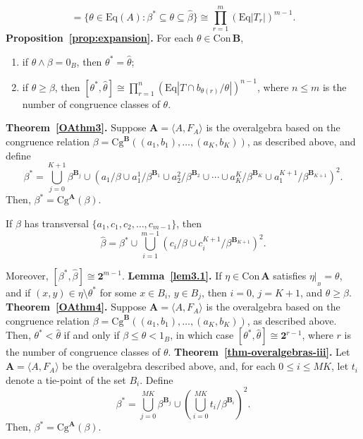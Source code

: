 \documentclass[cm,dissertation,actual,final]{uhthesis}
\theoremstyle{plain}
\theoremstyle{definition}
\theoremstyle{remark}
\numberwithin{theorem}{section}
\numberwithin{claim}{chapter}
\numberwithin{equation}{section}
\numberwithin{conjecture}{chapter}
\newcommand{\<}{\ensuremath{\langle}}
\renewcommand{\>}{\ensuremath{\rangle}}
\renewcommand{\leq}{\ensuremath{\leqslant}}
\renewcommand{\geq}{\ensuremath{\geqslant}}
\newcommand{\meet}{\ensuremath{\wedge}}
\newcommand{\Eq}{\ensuremath{\mathrm{Eq}}}
\newcommand{\Cg}{\ensuremath{\mathrm{Cg}}}
\newcommand{\Con}{\ensuremath{\mathrm{Con\,}}}
\newcommand{\0}{\ensuremath{\mathbf{0}}}
\newcommand{\1}{\ensuremath{\mathbf{1}}}
\newcommand{\2}{\ensuremath{\mathbf{2}}}
\newcommand{\3}{\ensuremath{\mathbf{3}}}
\newcommand{\4}{\ensuremath{\mathbf{4}}}
\newcommand{\5}{\ensuremath{\mathbf{5}}}
\newcommand{\bA}{\ensuremath{\mathbf{A}}}
\newcommand{\bB}{\ensuremath{\mathbf{B}}}
\newcommand{\resB}{\ensuremath{|_{_B}}}
\newcommand{\two}{\ensuremath{\mathbf{2}}}
\begin{document}
  \begin{equation*}
          [\beta^*, \widehat{\beta}] 
          = 
          \{\theta \in \Eq(A) : \beta^* \subseteq \theta \subseteq \widehat{\beta} \}
          \cong \prod_{r=1}^m (\Eq |T_r|)^{m-1}.
  \end{equation*}
\vskip4mm \noindent
{\bf Proposition~\ref{prop:expansion}.}
  For each  $\theta \in \Con\bB$,
  \begin{enumerate}
  \item if $\theta \meet \beta = 0_B$, then $\theta^* = \widehat{\theta}$;
  \item if $\theta \geq \beta$, then $[\theta^*, \widehat{\theta}] \cong
    \prod_{r=1}^n (\Eq |T \cap b_{\theta(r)}/\theta|)^{n-1}$, where $n\leq m$  is
    the number of congruence classes of $\theta$.
  \end{enumerate}
\vskip4mm \noindent
{\bf Theorem~\ref{OAthm3}.}
  Suppose $\bA = \< A, F_A\>$ is the overalgebra
  based on the congruence relation $\beta = \Cg^{\bB}((a_1, b_1), \dots,
  (a_K,b_K))$, as described above, and define
  \[ \beta^* = \bigcup_{j=0}^{K+1} \beta^{\bB_j} \cup 
  (a_1/\beta \cup a_1^1/\beta^{\bB_1} \cup a_2^2/\beta^{\bB_2}    \cup \cdots \cup a_K^K/\beta^{\bB_K}\cup a_1^{K+1}/\beta^{\bB_{K+1}})^2.
  \]
  Then, $\beta^* = \Cg^{\bA}(\beta)$.  

  If $\beta$ has transversal $\{a_1, c_1, c_2, \dots, c_{m-1}\}$, then
  \begin{equation*}
    \widehat{\beta} = \beta^* \cup \bigcup_{i=1}^{m-1} (c_i/\beta \cup
    c^{K+1}_i/\beta^{\bB_{K+1}})^2.
  \end{equation*}

  Moreover, $[\beta^*, \widehat{\beta}] \cong \two^{m-1}$.
\vskip4mm \noindent
{\bf Lemma~\ref{lem3.1}.}
  If $\eta \in \Con\bA$ satisfies $\eta\resB =
  \theta$, and if $(x,y) \in \eta \setminus \theta^*$ for some 
  $x\in B_i, \, y\in B_j$, then $i=0, \, j=K+1$, and $\theta \geq \beta$.
\vskip4mm \noindent
{\bf Theorem~\ref{OAthm4}.}
  Suppose $\bA = \< A, F_A\>$ is the overalgebra
  based on the congruence relation $\beta = \Cg^{\bB}((a_1, b_1), \dots,
  (a_K,b_K))$, as described above. Then,
  $\theta^* < \widehat{\theta}$ if and only if
  $\beta\leq \theta < 1_B$, in which case $[\theta^*, \widehat{\theta}] \cong \two^{r-1}$, where $r$
  is the number of congruence classes of $\theta$. 
\vskip4mm \noindent
{\bf Theorem~\ref{thm-overalgebras-iii}.}
  Let $\bA = \< A, F_A\>$ be the overalgebra described above,
  and, for each $0\leq i \leq MK$, let $t_i$ denote a tie-point of the set 
  $B_i$.  Define
  \[ \beta^* = \bigcup_{j=0}^{MK} \beta^{\bB_j} \cup 
  \left(\bigcup_{i=0}^{MK}t_i/\beta^{\bB_i}\right)^2.
  \]
  Then, $\beta^* = \Cg^{\bA}(\beta)$.
\end{document}
